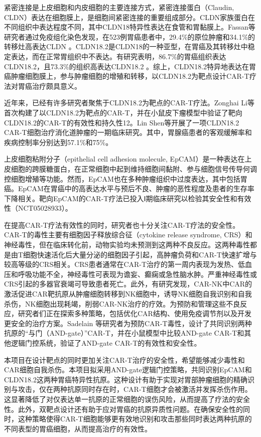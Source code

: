 \documentclass[12pt]{article}
\begin{document}
紧密连接是上皮细胞和内皮细胞的主要连接方式\cite{7}，紧密连接蛋白（Claudin, CLDN）表达在细胞膜上，是细胞间紧密连接的重要组成部分\cite{8}。CLDN家族蛋白在不同组织中表达程度不同，其中CLDN18特异性表达在食管和胃黏膜上\cite{9}。Fassan等研究者通过免疫组化染色发现，在523例胃癌患者中，29.4\%的原位肿瘤和34.1\%的转移灶高表达CLDN \cite{10}。CLDN18.2是CLDN18的一种亚型，在胃癌及其转移灶中稳定表达，而在正常胃组织中不表达\cite{11}。有研究表明，86.7\%的胃癌组织表达CLDN18.2，且73.3\%的组织高表达CLDN18.2 \cite{12}。综上，CLDN18.2特异地表达在胃癌肿瘤细胞膜上，参与肿瘤细胞的增殖和转移，以CLDN18.2为靶点设计CAR-T疗法对胃癌治疗颇具意义。

近年来，已经有许多研究者聚焦于CLDN18.2为靶点的CAR-T疗法。Zonghai Li等首次构建了以CLDN18.2为靶点的CAR-T，并在小鼠皮下瘤模型中验证了靶向CLDN18.2的CAR-T的有效性和持久性12。Lin Shen等开展了一项CLDN18.2 CAR-T细胞治疗消化道肿瘤的一期临床研究。其中，胃腺癌患者的客观缓解率和疾病控制率分别达到57.1\%和75\%\cite{13}。

上皮细胞粘附分子（epithelial cell adhesion molecule, EpCAM）是一种表达在上皮细胞的跨膜糖蛋白，在正常细胞中起到维持细胞间黏附、参与细胞信号传导何调控细胞增殖等功能\cite{14}。然而，EpCAM也在多种肿瘤组织中过度表达，其中包括胃癌\cite{15}。EpCAM在胃癌中的高表达水平与预后不良、肿瘤的恶性程度及患者的生存率下降相关\cite{16}。靶向EpCAM的CAR-T疗法已投入Ⅰ期临床研究以检验其安全性和有效性（NCT05028933）。

在提高CAR-T疗法有效性的同时，研究者也十分关注CAR-T疗法的安全性。CAR-T的毒性主要有细胞因子释放综合征（cytokine release syndrome, CRS）和神经毒性，但在临床转化前，动物实验均未预测到这两种不良反应\cite{17}。这两种毒性都是由T细胞快速活化后大量分泌的细胞因子引起，高肿瘤负荷和CAR-T快速扩增与较高等级的CRS相关\cite{18}。CRS患者通常在CAR-T治疗的第一周内表现为发热、低血压和呼吸功能不全\cite{19,20}，神经毒性可表现为谵妄、癫痫或急性脑水肿\cite{21}。严重神经毒性或CRS引起的多器官衰竭可导致患者死亡。此外，有研究发现，CAR-NK中CAR的激活促进CAR靶抗原从肿瘤细胞转移到NK细胞中，诱导NK细胞自我识别和自我杀伤，NK细胞出现耗竭，削弱CAR-NK治疗的疗效\cite{22}。为预防和管理这些不良反应，研究者们正在探索多种策略，包括优化CAR结构、使用免疫调节剂以及开发更安全的治疗方案。Sadelain 等研究者为预防CAR-T毒性，设计了共同识别两种抗原的“与门（AND-gate）”CAR-T，并在小鼠模型中比较AND-gate CAR-T和其他逻辑门控系统，验证了AND-gate CAR-T的有效性和安全性\cite{23}。

本项目在设计靶点的同时更加关注CAR-T治疗的安全性，希望能够减少毒性和CAR细胞自我杀伤。本项目拟采用AND-gate逻辑门控策略，共同识别EpCAM和CLDN18.2这两种胃癌特异性抗原。这种设计有助于实现对胃部肿瘤细胞的精确识别与攻击，仅在两种抗原同时存在时，CAR-T细胞才会被激活并发挥杀伤作用。这显著降低了对仅表达单一抗原的正常细胞的误伤风险，从而提高了疗法的安全性。此外，双靶点设计还有助于应对胃癌的抗原异质性问题。在确保安全性的同时，这种策略使得CAR-T细胞能够更有效地识别和攻击那些同时表达两种抗原的不同表型的胃癌细胞，从而提高治疗的有效性。
\end{document}
